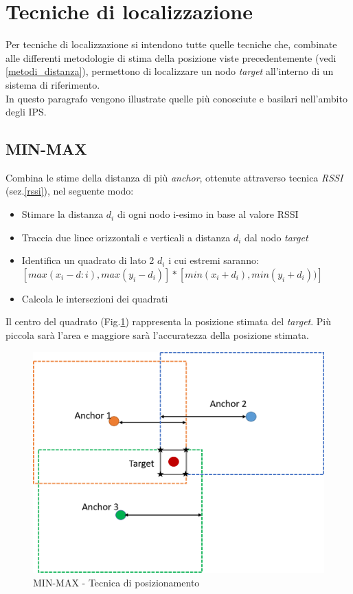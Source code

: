 \section{Tecniche di localizzazione}
Per tecniche di localizzazione si intendono tutte quelle tecniche che, combinate alle differenti metodologie di stima della posizione viste precedentemente (vedi \ref{metodi_distanza}), permettono di localizzare un nodo \textit{target} all'interno di un sistema di riferimento.\\
In questo paragrafo vengono illustrate quelle più conosciute e basilari nell'ambito degli IPS.

\subsection{MIN-MAX}
Combina le stime della distanza di più \textit{anchor}, ottenute attraverso tecnica \textit{RSSI} (sez.\ref{rssi}), nel seguente modo:

\begin{itemize}
	\item Stimare la distanza $d_i$ di ogni nodo i-esimo in base al valore RSSI
	\item Traccia due linee orizzontali e verticali a distanza $d_i$ dal nodo \textit{target}
	\item Identifica un quadrato di lato 2  $d_i$ i cui estremi saranno: \\
			$[max(x_i-d:i),max(y_i-d_i)] * [min(x_i+d_i),min(y_i+d_i))]$
	\item Calcola le intersezioni dei quadrati
\end{itemize}

Il centro del quadrato (Fig.\ref{fig:minmax}) rappresenta la posizione stimata del \textit{target}. Più piccola sarà l’area e maggiore sarà l’accuratezza della posizione stimata.
\begin{figure}[H]  
	\centering 
	\includegraphics[scale=0.4]{ContestoApplicativo/minmax.png}
	\caption{MIN-MAX - Tecnica di posizionamento }
	\label{fig:minmax}
\end{figure}



